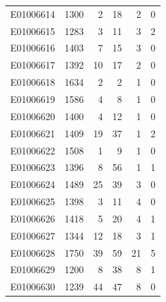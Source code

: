 \documentclass[
  letterpaper,
  DIV=11,
  numbers=noendperiod]{scrreprt}
\begin{document}
\begin{tabular}{lrrrrr}
E01006614     &    1300 &       2 &                    18 &                               2 &                       0 \\
E01006615     &    1283 &       3 &                    11 &                               3 &                       2 \\
E01006616     &    1403 &       7 &                    15 &                               3 &                       0 \\
E01006617     &    1392 &      10 &                    17 &                               2 &                       0 \\
E01006618     &    1634 &       2 &                     2 &                               1 &                       0 \\
E01006619     &    1586 &       4 &                     8 &                               1 &                       0 \\
E01006620     &    1400 &       4 &                    12 &                               1 &                       0 \\
E01006621     &    1409 &      19 &                    37 &                               1 &                       2 \\
E01006622     &    1508 &       1 &                     9 &                               1 &                       0 \\
E01006623     &    1396 &       8 &                    56 &                               1 &                       1 \\
E01006624     &    1489 &      25 &                    39 &                               3 &                       0 \\
E01006625     &    1398 &       3 &                    11 &                               4 &                       0 \\
E01006626     &    1418 &       5 &                    20 &                               4 &                       1 \\
E01006627     &    1344 &      12 &                    18 &                               3 &                       1 \\
E01006628     &    1750 &      39 &                    59 &                              21 &                       5 \\
E01006629     &    1200 &       8 &                    38 &                               8 &                       1 \\
E01006630     &    1239 &      44 &                    47 &                               8 &                       0 \\

\end{tabular}
\end{document}
